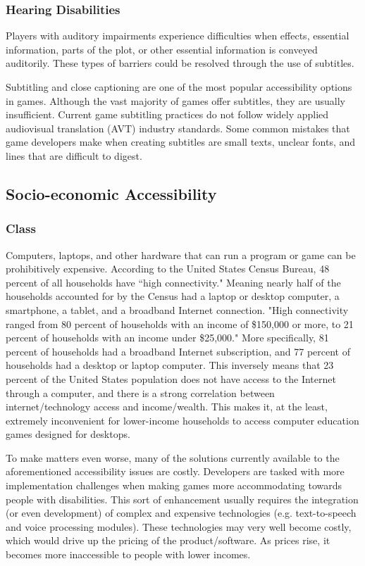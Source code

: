 \documentclass[10pt,twocolumn]{article}
\begin{document}
\subsubsection{Hearing Disabilities}
    Players with auditory impairments experience difficulties when effects, essential information, parts of the plot, or other essential information is conveyed auditorily. \cite{eskelinen2001gaming} These types of barriers could be resolved through the use of subtitles.
    
    Subtitling and close captioning are one of the most popular accessibility options in games. Although the vast majority of games offer subtitles, they are usually insufficient. Current game subtitling practices do not follow widely applied audiovisual translation (AVT) industry standards. \cite{mangiron2013subtitling} Some common mistakes that game developers make when creating subtitles are small texts, unclear fonts, and lines that are difficult to digest. 


\subsection{Socio-economic Accessibility}
\subsubsection{Class}
    Computers, laptops, and other hardware that can run a program or game can be prohibitively expensive. According to the United States Census Bureau, 48 percent of all households have “high connectivity." \cite{ryan2017computer} Meaning nearly half of the households accounted for by the Census had a laptop or desktop computer, a smartphone, a tablet, and a broadband Internet connection. "High connectivity ranged from 80 percent of households with an income of \$150,000 or more, to 21 percent of households with an income under \$25,000." \cite{ryan2017computer} More specifically, 81 percent of households had a broadband Internet subscription, and 77 percent of households had a desktop or laptop computer. \cite{ryan2017computer} This inversely means that 23 percent of the United States population does not have access to the Internet through a computer, and there is a strong correlation between internet/technology access and income/wealth. This makes it, at the least, extremely inconvenient for lower-income households to access computer education games designed for desktops. 

    To make matters even worse, many of the solutions currently available to the aforementioned accessibility issues are costly. Developers are tasked with more implementation challenges when making games more accommodating towards people with disabilities. This sort of enhancement usually requires the integration (or even development) of complex and expensive technologies (e.g. text-to-speech and voice processing modules). \cite{torrente2014towards} These technologies may very well become costly, which would drive up the pricing of the product/software. As prices rise, it becomes more inaccessible to people with lower incomes.
\end{document}
